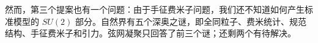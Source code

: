 然而，第三个提案也有一个问题：由于手征费米子问题，我们还不知道如何产生标准模型的 $SU(2)$ 部分。自然界有五个深奥之谜，即全同粒子、费米统计、规范结构、手征费米子和引力。弦网凝聚只回答了前三个谜；还剩两个有待解决。

